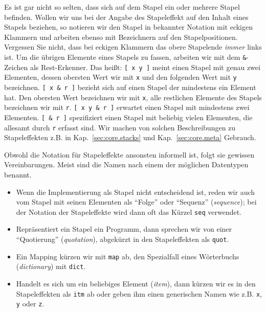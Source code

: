 

Es ist gar nicht so selten, dass sich auf dem Stapel ein oder mehrere Stapel befinden. Wollen wir uns bei der Angabe des Stapeleffekt auf den Inhalt eines Stapels beziehen, so notieren wir den Stapel in bekannter Notation mit eckigen Klammern und arbeiten ebenso mit Bezeichnern auf den Stapelpositionen. Vergessen Sie nicht, dass bei eckigen Klammern das obere Stapelende \emph{immer} links ist. Um die übrigen Elemente eines Stapels zu fassen, arbeiten wir mit dem \verb|&|-Zeichen als Rest-Erkenner. Das heißt: \verb|[ x y ]| meint einen Stapel mit genau zwei Elementen, dessen obersten Wert wir mit \verb|x| und den folgenden Wert mit \verb|y| bezeichnen. \verb|[ x & r ]| bezieht sich auf einen Stapel der mindestens ein Element hat. Den obersten Wert bezeichnen wir mit \verb|x|, alle restlichen Elemente des Stapels bezeichnen wir mit \verb|r|. \verb|[ x y & r ]| erwartet einen Stapel mit mindestens zwei Elementen. \verb|[ & r ]| spezifiziert einen Stapel mit beliebig vielen Elementen, die allesamt durch \verb|r| erfasst sind. Wir machen von solchen Beschreibungen zu Stapeleffekten z.B. in Kap.~\ref{sec:core.stacks} und Kap.~\ref{sec:core.meta} Gebrauch.

Obwohl die Notation für Stapeleffekte ansonsten informell ist, folgt sie gewissen Vereinbarungen. Meist sind die Namen nach einem der möglichen Datentypen benannt.

\begin{itemize}
\item Wenn die Implementierung als Stapel nicht entscheidend ist, reden wir auch vom Stapel mit seinen Elementen als "`Folge"' oder "`Sequenz"' (\emph{sequence}); bei der Notation der Stapeleffekte wird dann oft das Kürzel \verb|seq| verwendet.
\item Repräsentiert ein Stapel ein Programm, dann sprechen wir von einer "`Quotierung"' (\emph{quotation}), abgekürzt in den Stapeleffekten als \verb|quot|.
\item Ein Mapping kürzen wir mit \verb|map| ab, den Spezialfall eines Wör\-ter\-buchs (\emph{dictionary}) mit \verb|dict|. 
\item Handelt es sich um ein beliebiges Element (\emph{item}), dann kürzen wir es in den Stapeleffekten als \verb|itm| ab oder geben ihm einen generischen Namen wie z.B. \verb|x|, \verb|y| oder \verb|z|.
\end{itemize}

